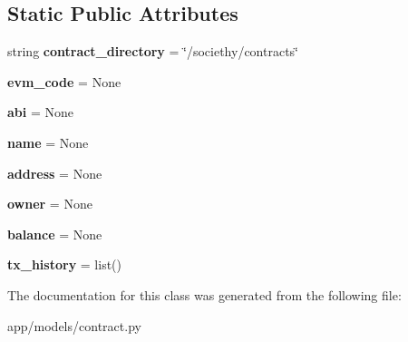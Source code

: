 \subsection*{Static Public Attributes}
\begin{DoxyCompactItemize}
\item 
\mbox{\label{classapp_1_1models_1_1contract_1_1_contract_document_a713d456328f66552e7395633601492e9}} 
string {\bfseries contract\+\_\+directory} = \char`\"{}/societhy/contracts\char`\"{}
\item 
\mbox{\label{classapp_1_1models_1_1contract_1_1_contract_document_a2368fb3ccc4453f4fec6ee5867e3622b}} 
{\bfseries evm\+\_\+code} = None
\item 
\mbox{\label{classapp_1_1models_1_1contract_1_1_contract_document_a784629cb295788b9df7f5eb418005802}} 
{\bfseries abi} = None
\item 
\mbox{\label{classapp_1_1models_1_1contract_1_1_contract_document_abc59b0d339bbf9e8f26a89ef175bfa05}} 
{\bfseries name} = None
\item 
\mbox{\label{classapp_1_1models_1_1contract_1_1_contract_document_a97c1d3946169e90ae8456f4cc9de974e}} 
{\bfseries address} = None
\item 
\mbox{\label{classapp_1_1models_1_1contract_1_1_contract_document_ae583866e26aa0d445069e2f97aadb976}} 
{\bfseries owner} = None
\item 
\mbox{\label{classapp_1_1models_1_1contract_1_1_contract_document_a3194b3377072585f73e991513447e82b}} 
{\bfseries balance} = None
\item 
\mbox{\label{classapp_1_1models_1_1contract_1_1_contract_document_a0305451d2e3067f8630b6dfaee6aea98}} 
{\bfseries tx\+\_\+history} = list()
\end{DoxyCompactItemize}


The documentation for this class was generated from the following file\+:\begin{DoxyCompactItemize}
\item 
app/models/contract.\+py\end{DoxyCompactItemize}

